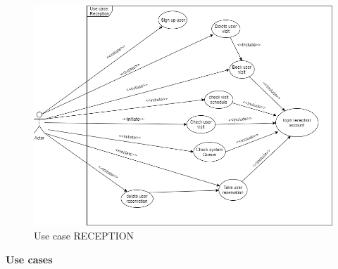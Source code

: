  \par \medskip 
 
 \begin{figure}[h]
 	\caption{Use case RECEPTION}
 	\label{fig:UML}
 	
 	\centering
 	\includegraphics[width=1\textwidth, height=1\textwidth]{diagrams/UseCaseReception.png}
 	
 \end{figure}
 
 \addvspace{1cm} 
 {\normalsize \textbf{Use cases}}
 \par \medskip
 
